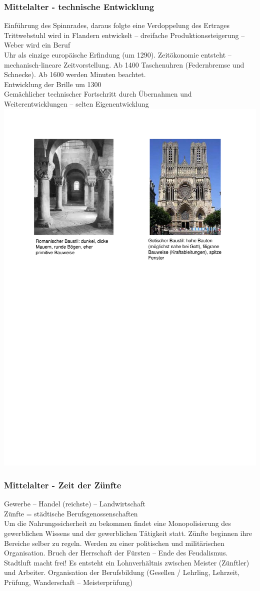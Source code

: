 \documentclass[10pt, openright=true]{scrartcl}
\begin{document}
\subsubsection{Mittelalter - technische Entwicklung}
Einführung des Spinnrades, daraus folgte eine Verdoppelung des Ertrages\\
Trittwebstuhl wird in Flandern entwickelt – dreifache Produktionssteigerung – Weber wird ein Beruf\\
Uhr als einzige europäische Erfindung (um 1290). Zeitökonomie entsteht – mechanisch-lineare Zeitvorstellung. Ab 1400 Taschenuhren (Federnbremse und Schnecke). Ab 1600 werden Minuten beachtet.\\
Entwicklung der Brille um 1300 \\
Gemächlicher technischer Fortschritt durch Übernahmen und Weiterentwicklungen – selten
Eigenentwicklung\\
\includegraphics[width=.8\textwidth]{images/Baustil1}
\subsubsection{Mittelalter - Zeit der Zünfte}
Gewerbe – Handel (reichste) – Landwirtschaft\\
Zünfte = städtische Berufsgenossenschaften\\
Um die Nahrungssicherheit zu bekommen findet eine Monopolisierung des gewerblichen Wissens und der gewerblichen Tätigkeit statt. Zünfte beginnen ihre Bereiche selber zu regeln. Werden zu einer politischen und militärischen
Organisation. Bruch der Herrschaft der Fürsten – Ende des Feudalismus. \glqq Stadtluft macht frei! \grqq Es entsteht ein Lohnverhältnis zwischen Meister (Zünftler) und Arbeiter. Organisation der Berufsbildung (Gesellen / Lehrling, Lehrzeit, Prüfung, Wanderschaft – Meisterprüfung)
\end{document}
